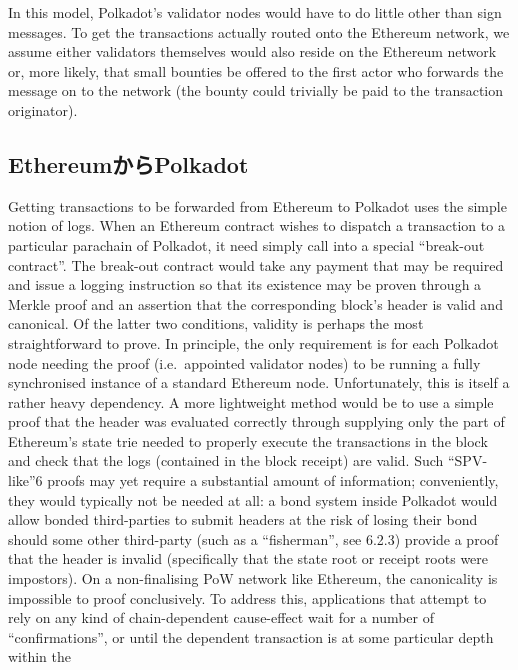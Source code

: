 In this model, Polkadot's validator nodes would have to do little other
than sign messages. To get the transactions actually routed onto the
Ethereum network, we assume either validators themselves would also
reside on the Ethereum network or, more likely, that small bounties be
offered to the first actor who forwards the message on to the network
(the bounty could trivially be paid to the transaction originator).

\hypertarget{ethereumux304bux3089polkadot}{%
\subsection{EthereumからPolkadot}\label{ethereumux304bux3089polkadot}}

Getting transactions to be forwarded from Ethereum to Polkadot uses the
simple notion of logs. When an Ethereum contract wishes to dispatch a
transaction to a particular parachain of Polkadot, it need simply call
into a special ``break-out contract''. The break-out contract would take
any payment that may be required and issue a logging instruction so that
its existence may be proven through a Merkle proof and an assertion that
the corresponding block's header is valid and canonical. Of the latter
two conditions, validity is perhaps the most straightforward to prove.
In principle, the only requirement is for each Polkadot node needing the
proof (i.e.~appointed validator nodes) to be running a fully
synchronised instance of a standard Ethereum node. Unfortunately, this
is itself a rather heavy dependency. A more lightweight method would be
to use a simple proof that the header was evaluated correctly through
supplying only the part of Ethereum's state trie needed to properly
execute the transactions in the block and check that the logs (contained
in the block receipt) are valid. Such ``SPV-like''6 proofs may yet
require a substantial amount of information; conveniently, they would
typically not be needed at all: a bond system inside Polkadot would
allow bonded third-parties to submit headers at the risk of losing their
bond should some other third-party (such as a ``fisherman'', see 6.2.3)
provide a proof that the header is invalid (specifically that the state
root or receipt roots were impostors). On a non-finalising PoW network
like Ethereum, the canonicality is impossible to proof conclusively. To
address this, applications that attempt to rely on any kind of
chain-dependent cause-effect wait for a number of ``confirmations'', or
until the dependent transaction is at some particular depth within the
